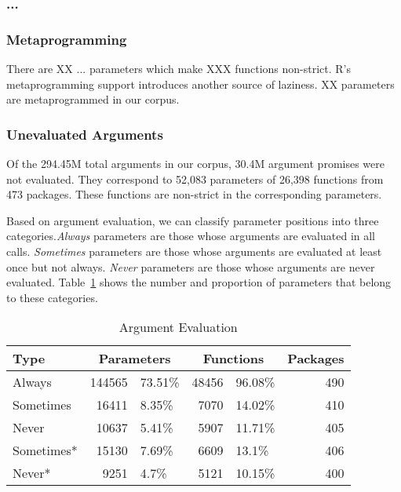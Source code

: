 \documentclass[screen,acmsmall]{acmart}
\newcommand{\always}{\emph{Always}\xspace}
\newcommand{\sometimes}{\emph{Sometimes}\xspace}
\newcommand{\never}{\emph{Never}\xspace}
\begin{document}
\subsubsection{...}

\subsubsection{Metaprogramming}
There are XX $...$ parameters which make XXX functions non-strict. R's
metaprogramming support introduces another source of laziness. XX parameters are
metaprogrammed in our corpus.

\subsubsection{Unevaluated Arguments}
Of the 294.45M total arguments in our corpus, 30.4M argument promises were not
evaluated. They correspond to 52,083 parameters of 26,398 functions from 473
packages. These functions are non-strict in the corresponding parameters.

Based on argument evaluation, we can classify parameter positions into three
categories.\always parameters are those whose arguments are evaluated in all
calls. \sometimes parameters are those whose arguments are evaluated at least
once but not always. \never parameters are those whose arguments are never
evaluated. Table~\ref{table:argeval} shows the number and proportion of
parameters that belong to these categories.

\begin{table}[!h]
  \vspace{-3mm}
  \caption{Argument Evaluation}\label{table:argeval}
  \vspace{-3mm}
  \begin{tabular}{lr|lr|lr}
    \toprule
    \textbf{Type}&\multicolumn{2}{c}{\textbf{Parameters}}&\multicolumn{2}{c}{\textbf{Functions}}&\textbf{Packages}\\
    \midrule
    Always&144565&73.51\%&48456&96.08\%&490\\
    Sometimes&16411&8.35\%&7070&14.02\%&410\\
    Never&10637&5.41\%&5907&11.71\%&405\\
    \midrule
    Sometimes*&15130&7.69\%&6609&13.1\%&406\\
    Never*&9251&4.7\%&5121&10.15\%&400\\
    \bottomrule
  \end{tabular}
\end{table}
\end{document}

